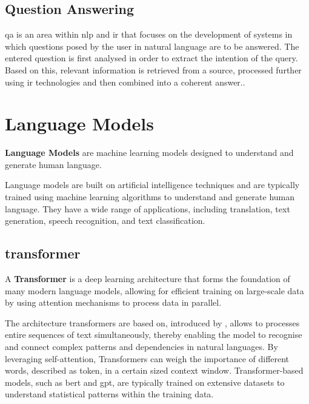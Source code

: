 \subsection{Question Answering}\label{subsec:question answering}
\begin{definition}
\ac{qa} is an area within \ac{nlp} and \ac{ir} that focuses on the development of systems in which questions posed by the user in natural language are to be answered. 
The entered question is first analysed in order to extract the intention of the query. 
Based on this, relevant information is retrieved from a source, processed further using \ac{ir} technologies and then combined into a coherent answer.\citep{Manning2008}.
%
\section{Language Models}\label{sec:language-models}
%
\begin{definition}\label{def:language-models}
    \textbf{Language Models} are machine learning models designed to understand and generate human language.
\end{definition}
Language models are built on artificial intelligence techniques and are typically trained using machine learning algorithms to understand and generate human language. 
They have a wide range of applications, including translation, text generation, speech recognition, and text classification.
\subsection{transformer}\label{transformer}
\begin{definition}\label{def:transformer}
    A \textbf{Transformer} is a deep learning architecture that forms the foundation of many modern language models, allowing for efficient training on large-scale data by using attention mechanisms to process data in parallel.
\end{definition}
The architecture transformers are based on, introduced by \citet{vaswani2017attention}, allows to processes entire sequences of text simultaneously, thereby enabling the model to recognise and connect complex patterns and dependencies in natural languages. 
By leveraging self-attention, Transformers can weigh the importance of different words, described as token, in a certain sized context window. 
Transformer-based models, such as \ac{bert} and \ac{gpt}, are typically trained on extensive datasets to understand statistical patterns within the training data.\citep{atallah2023impact}


\end{definition}
